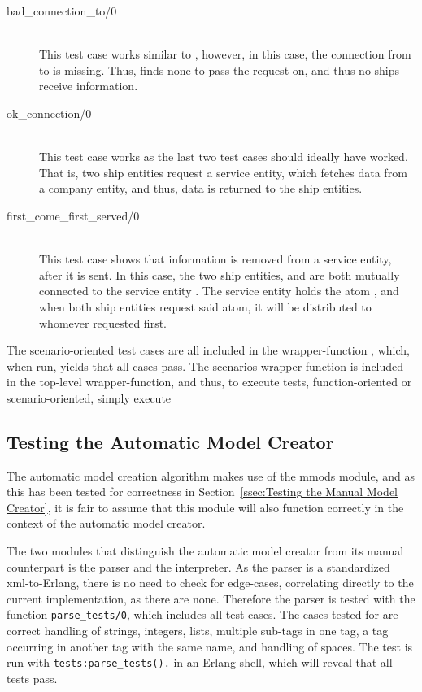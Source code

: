 \begin{description}
  \item[{bad\_connection\_to/0}]\ \\
    This test case works similar to , however, in this case, the connection from  to  is missing. Thus,  finds none to pass the request on, and thus no ships receive information.
  \item[{ok\_connection/0}]\ \\
    This test case works as the last two test cases should ideally have worked. That is, two ship entities request a service entity, which fetches data from a company entity, and thus, data is returned to the ship entities.
  \item[{first\_come\_first\_served/0}]\ \\
    This test case shows that information is removed from a service entity, after it is sent. In this case, the two ship entities,  and  are both mutually connected to the service entity . The service entity holds the atom , and when both ship entities request said atom, it will be distributed to whomever requested first. 
\end{description}

The scenario-oriented test cases are all included in the wrapper-function , which, when run, yields that all cases pass. The scenarios wrapper function is included in the top-level wrapper-function, and thus, to execute  tests, function-oriented or scenario-oriented, simply execute 

\subsection{Testing the Automatic Model Creator}

The automatic model creation algorithm makes use of the mmods module, and as this has been tested for correctness in Section~\ref{ssec:Testing the Manual Model Creator}, it is fair to assume that this module will also function correctly in the context of the automatic model creator. 

The two modules that distinguish the automatic model creator from its manual counterpart is the parser and the interpreter. As the parser is a standardized xml-to-Erlang, there is no need to check for edge-cases, correlating directly to the current implementation, as there are none. Therefore the parser is tested with the function \lstinline{parse_tests/0}, which includes all test cases. The cases tested for are correct handling of strings, integers, lists, multiple sub-tags in one tag, a tag occurring in another tag with the same name, and handling of spaces. The test is run with \lstinline{tests:parse_tests().} in an Erlang shell, which will reveal that all tests pass.

